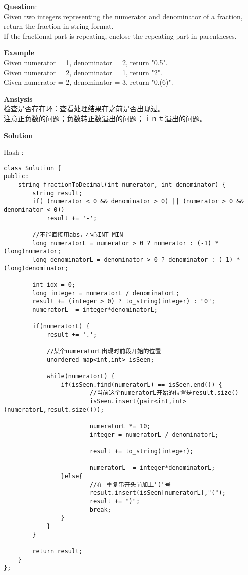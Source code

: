     
\begin{description}
    \item{\textbf{Question}}:\\%
		Given two integers representing the numerator and denominator of a fraction, return the fraction in string format.\\
		If the fractional part is repeating, enclose the repeating part in parentheses.

    \item{\textbf{Example}}\\
		Given numerator = 1, denominator = 2, return "0.5".\\
		Given numerator = 2, denominator = 1, return "2".\\
		Given numerator = 2, denominator = 3, return "0.(6)".

    \item{\textbf{Anslysis}}\\
		检查是否存在环：查看处理结果在之前是否出现过。\\
		注意正负数的问题；负数转正数溢出的问题；ｉｎｔ溢出的问题。\\

    \item{\textbf{Solution}}\\
	\item{Hash} : \\
		\begin{lstlisting}
class Solution {
public:
    string fractionToDecimal(int numerator, int denominator) {
	    string result;
		if( (numerator < 0 && denominator > 0) || (numerator > 0 && denominator < 0))
			result += '-';

		//不能直接用abs，小心INT_MIN
		long numeratorL = numerator > 0 ? numerator : (-1) * (long)numerator;
		long denominatorL = denominator > 0 ? denominator : (-1) * (long)denominator;

		int idx = 0;
	    long integer = numeratorL / denominatorL;
	    result += (integer > 0) ? to_string(integer) : "0";
	    numeratorL -= integer*denominatorL; 

		if(numeratorL) {
		    result += '.';

			//某个numeratorL出现时前段开始的位置
			unordered_map<int,int> isSeen;

			while(numeratorL) {
				if(isSeen.find(numeratorL) == isSeen.end()) {
						//当前这个numeratorL开始的位置是result.size()
						isSeen.insert(pair<int,int>(numeratorL,result.size()));

						numeratorL *= 10;
						integer = numeratorL / denominatorL;

						result += to_string(integer);

						numeratorL -= integer*denominatorL;
				}else{
						//在 重复串开头前加上'('号
						result.insert(isSeen[numeratorL],"(");
						result += ")";
						break;
				}
			}
		}

		return result;
    }
};
		\end{lstlisting}

\end{description}

